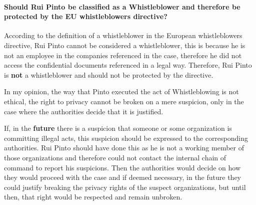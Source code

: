     
    
    \paragraph{Should Rui Pinto be classified as a Whistleblower and therefore be protected by the EU whistleblowers directive?}
    According to the definition of a whistleblower in the European whistleblowers directive, Rui Pinto cannot be considered a whistleblower, this is because he is not an employee in the companies referenced in the case, therefore he did not access the confidential documents referenced in a legal way.
    Therefore, Rui Pinto is \textbf{not} a whistleblower and should not be protected by the directive.

    In my opinion, the way that Pinto executed the act of Whistleblowing is not ethical, the right to privacy cannot be broken on a mere suspicion, only in the case where the authorities decide that it is justified.


    If, in the \textbf{future} there is a suspicion that someone or some organization is committing illegal acts, this suspicion should be expressed to the corresponding authorities.
    Rui Pinto should have done this as he is not a working member of those organizations and therefore could not contact the internal chain of command to report his suspicions.
    Then the authorities would decide on how they would proceed with the case and if deemed necessary, in the future they could justify breaking the privacy rights of the suspect organizations, but until then, that right would be respected and remain unbroken.


